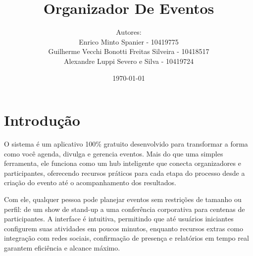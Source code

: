 \documentclass[12pt]{article}  %
\title{Organizador De Eventos}
\author{Autores:\\Enrico Minto Spanier - 10419775 \\ Guilherme Vecchi Bonotti Freitas Silveira - 10418517 \\ Alexandre Luppi Severo e Silva - 10419724}
\date{\today}
\begin{document}
  
\maketitle
\tableofcontents

\section{Introdução}  
O sistema é um aplicativo 100\% gratuito desenvolvido para transformar a forma como você agenda, divulga e gerencia eventos. Mais do que uma simples ferramenta, ele funciona como um hub inteligente que conecta organizadores e participantes, oferecendo recursos práticos para cada etapa do processo desde a criação do evento até o acompanhamento dos resultados.

Com ele, qualquer pessoa pode planejar eventos sem restrições de tamanho ou perfil: de um show de stand-up a uma conferência corporativa para centenas de participantes. A interface é intuitiva, permitindo que até usuários iniciantes configurem suas atividades em poucos minutos, enquanto recursos extras como integração com redes sociais, confirmação de presença e relatórios em tempo real garantem eficiência e alcance máximo.
\end{document}
